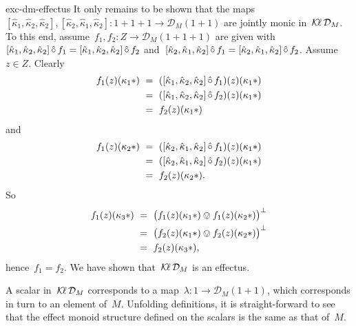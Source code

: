 \begin{solution}{exc-dm-effectus}
It only remains to be shown that the
    maps~$
    [\hat\kappa_1, \hat\kappa_2, \hat\kappa_2],
    [\hat\kappa_2, \hat\kappa_1, \hat\kappa_2] \colon
        1+1+1 \to \mathcal{D}_M (1+1) $
        are jointly monic in~$\operatorname{\mathcal{K}\!\ell} \mathcal{D}_M$.
To this end,
assume~$f_1,f_2 \colon Z \to \mathcal{D}_M (1+1+1)$
are given with~$
    [\hat\kappa_1, \hat\kappa_2, \hat\kappa_2] \mathop{\hat\circ} f_1 =
    [\hat\kappa_1, \hat\kappa_2, \hat\kappa_2] \mathop{\hat\circ} f_2$
    and~$[\hat\kappa_2, \hat\kappa_1, \hat\kappa_2] \mathop{\hat\circ} f_1 =
    [\hat\kappa_2, \hat\kappa_1, \hat\kappa_2] \mathop{\hat\circ} f_2$.
Assume~$z \in Z$.
Clearly
\begin{align*}
f_1 (z)(\kappa_1 *)
            &\ =\  ([\hat \kappa_1, \hat\kappa_2, \hat\kappa_2] \mathop{\hat\circ}  f_1)
                (z)(\kappa_1 *)\\
            &\ =\  ([\hat \kappa_1, \hat\kappa_2, \hat\kappa_2] \mathop{\hat\circ}  f_2)
                (z)(\kappa_1 *)\\
            &\ =\  f_2(z)(\kappa_1 *)
\end{align*}
    and
\begin{align*}
    f_1 (z)(\kappa_2 *)
           &\ =\ ([\hat \kappa_2, \hat\kappa_1, \hat\kappa_2] \mathop{\hat\circ}  f_1)
                (z)(\kappa_1 *)\\
           &\ =\ ([\hat \kappa_2, \hat\kappa_1, \hat\kappa_2] \mathop{\hat\circ}  f_2)
                (z)(\kappa_1 *)\\
           &\ =\ f_2(z)(\kappa_2 *).
\end{align*}
So
\begin{align*}
f_1(z)(\kappa_3 *)
       &\ =\ \bigl(f_1(z)(\kappa_1 *) \ovee 
        f_1(z)(\kappa_2 *)\bigr)^\perp\\
       &\ =\ \bigl(f_2(z)(\kappa_1 *) \ovee 
        f_2(z)(\kappa_2 *)\bigr)^\perp\\
            &\ =\  f_2(z)(\kappa_3 *),
\end{align*}
hence~$f_1 = f_2$.
We have shown that~$\operatorname{\mathcal{K}\!\ell} \mathcal{D}_M$ is an effectus.

A scalar in~$\operatorname{\mathcal{K}\!\ell} \mathcal{D}_M$
    corresponds to a map~$\lambda\colon 1 \to \mathcal{D}_M (1+1)$,
        which corresponds in turn to an element of~$M$.
Unfolding definitions, it is straight-forward to see
    that the effect monoid structure defined on the scalars
        is the same as that of~$M$.
\end{solution}
